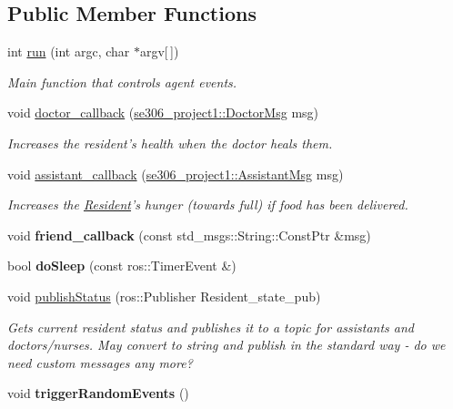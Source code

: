 \subsection*{Public Member Functions}
\begin{DoxyCompactItemize}
\item 
int \hyperlink{classResident_a43dac53b6516e2d30c3df845efc2e547}{run} (int argc, char $\ast$argv\mbox{[}$\,$\mbox{]})
\begin{DoxyCompactList}\small\item\em Main function that controls agent events. \end{DoxyCompactList}\item 
void \hyperlink{classResident_a6d8fbbc8a60508ec913fb41d7e743094}{doctor\-\_\-callback} (\hyperlink{structse306__project1_1_1DoctorMsg__}{se306\-\_\-project1\-::\-Doctor\-Msg} msg)
\begin{DoxyCompactList}\small\item\em Increases the resident's health when the doctor heals them. \end{DoxyCompactList}\item 
void \hyperlink{classResident_aa715d491e917de6f621593f0d1f01bd6}{assistant\-\_\-callback} (\hyperlink{structse306__project1_1_1AssistantMsg__}{se306\-\_\-project1\-::\-Assistant\-Msg} msg)
\begin{DoxyCompactList}\small\item\em Increases the \hyperlink{classResident}{Resident}'s hunger (towards full) if food has been delivered. \end{DoxyCompactList}\item 
\hypertarget{classResident_a33352541969842e16e716ba61fb242f1}{void {\bfseries friend\-\_\-callback} (const std\-\_\-msgs\-::\-String\-::\-Const\-Ptr \&msg)}\label{classResident_a33352541969842e16e716ba61fb242f1}

\item 
\hypertarget{classResident_accf6a08b67397acdbcc9c81226e5d746}{bool {\bfseries do\-Sleep} (const ros\-::\-Timer\-Event \&)}\label{classResident_accf6a08b67397acdbcc9c81226e5d746}

\item 
\hypertarget{classResident_a98b4c44b2cc5f0212f8889088bc881e1}{void \hyperlink{classResident_a98b4c44b2cc5f0212f8889088bc881e1}{publish\-Status} (ros\-::\-Publisher Resident\-\_\-state\-\_\-pub)}\label{classResident_a98b4c44b2cc5f0212f8889088bc881e1}

\begin{DoxyCompactList}\small\item\em Gets current resident status and publishes it to a topic for assistants and doctors/nurses. May convert to string and publish in the standard way -\/ do we need custom messages any more? \end{DoxyCompactList}\item 
\hypertarget{classResident_afb1119b2ff73ad3aa48732caee7b3d60}{void {\bfseries trigger\-Random\-Events} ()}\label{classResident_afb1119b2ff73ad3aa48732caee7b3d60}


\end{DoxyCompactItemize}

